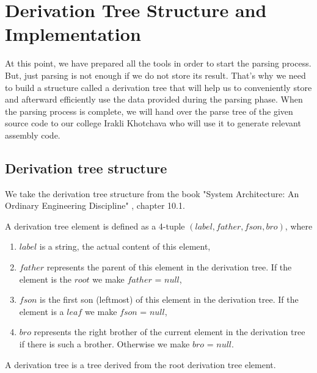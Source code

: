 \newpage


\section{Derivation Tree Structure and Implementation}\label{sec:Derivation Tree Structure and Implementation}

At this point, we have prepared all the tools in order to start the parsing process. But, just parsing is not enough if we do not store its result. That’s why we need to build a structure called a derivation tree that will help us to conveniently store and afterward efficiently use the data provided during the parsing phase. When the parsing process is complete, we will hand over the parse tree of the given source code to our college Irakli Khotchava who will use it to generate relevant assembly code.

\vspace{10pt}

\subsection{Derivation tree structure}

We take the derivation tree structure from the book "System Architecture: An Ordinary Engineering Discipline" \cite{sysbook}, chapter 10.1.

\begin{definition}[3.0]
    A derivation tree element is defined as a 4-tuple \((label, father, fson, bro)\), where
    \begin{enumerate}
        \item \(label\) is a string, the actual content of this element,
        \item \(father\) represents the parent of this element in the derivation tree. If the element is the \(root\) we make \(father\) = \(null\),
        \item \(fson\) is the first son (leftmost) of this element in the derivation tree. If the element is a \(leaf\) we make \(fson\) = \(null\),
        \item \(bro\) represents the right brother of the current element in the derivation tree if there is such a brother. Otherwise we make \(bro\) = \(null\).
    \end{enumerate}

    A derivation tree is a tree derived from the root derivation tree element.

\end{definition}
\setlength{\parindent}{0pt}


